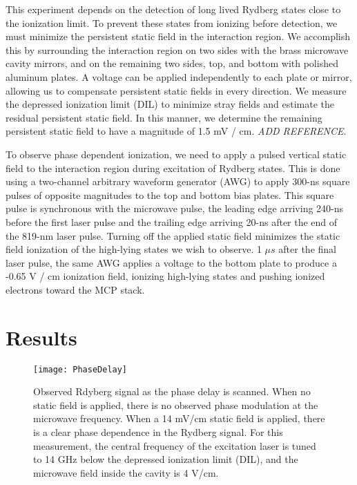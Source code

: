 \documentclass[aps,pra,preprint,groupedaddress]{revtex4-1}
\begin{document}
This experiment depends on the detection of long lived Rydberg states close to the ionization limit. To prevent these states from ionizing before detection, we must minimize the persistent static field in the interaction region. We accomplish this by surrounding the interaction region on two sides with the brass microwave cavity mirrors, and on the remaining two sides, top, and bottom with polished aluminum plates. A voltage can be applied independently to each plate or mirror, allowing us to compensate persistent static fields in every direction. We measure the depressed ionization limit (DIL) to minimize stray fields and estimate the residual persistent static field. In this manner, we determine the remaining persistent static field to have a magnitude of 1.5 mV / cm. \emph{ADD REFERENCE}.

To observe phase dependent ionization, we need to apply a pulsed vertical static field to the interaction region during excitation of Rydberg states. This is done using a two-channel arbitrary waveform generator (AWG) to apply 300-ns square pulses of opposite magnitudes to the top and bottom bias plates. This square pulse is synchronous with the microwave pulse, the leading edge arriving 240-ns before the first laser pulse and the trailing edge arriving 20-ns after the end of the 819-nm laser pulse. Turning off the applied static field minimizes the static field ionization of the high-lying states we wish to observe. 1 $\mu s$ after the final laser pulse, the same AWG applies a voltage to the bottom plate to produce a -0.65 V / cm ionization field, ionizing high-lying states and pushing ionized electrons toward the MCP stack.

\section{\label{results}Results}

\begin{figure}
	\texttt{[image: PhaseDelay]}
	\caption{Observed Rdyberg signal as the phase delay is scanned. When no static field is applied, there is no observed phase modulation at the microwave frequency. When a 14 mV/cm static field is applied, there is a clear phase dependence in the Rydberg signal. For this measurement, the central frequency of the excitation laser is tuned to 14 GHz below the depressed ionization limit (DIL), and the microwave field inside the cavity is 4 V/cm.}
	\label{fig:PhaseDelay}
\end{figure}
\end{document}
